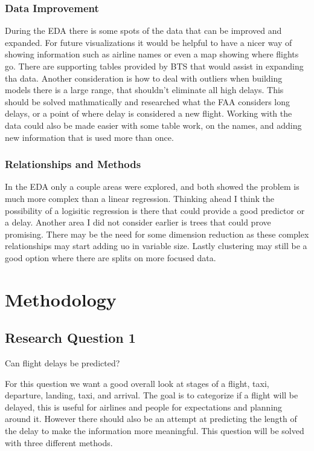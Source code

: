 \documentclass[a4paper,12pt]{article}
\begin{document}
\subsubsection{Data Improvement}
During the EDA there is some spots of the data that can be improved and expanded. For future visualizations it would be helpful to have a nicer way of showing information
such as airline names or even a map showing where flights go. There are supporting tables provided by BTS that would assist in expanding tha data. Another consideration is how to deal with outliers when building models
there is a large range, that shouldn't eliminate all high delays. This should be solved mathmatically and researched what the FAA considers long delays, or a point of where delay is considered a new flight. Working with the data 
could also be made easier with some table work, on the names, and adding new information that is used more than once.

\subsubsection{Relationships and Methods}
In the EDA only a couple areas were explored, and both showed the problem is much more complex than a linear regression. Thinking ahead I think the possibility of a logisitic regression is there that could provide a good predictor or a delay.
Another area I did not consider earlier is trees that could prove promising. There may be the need for some dimension reduction as these complex relationships may start adding uo in variable size. Lastly clustering may still be a good option where there are splits on more focused data.

\section{Methodology}

\subsection{Research Question 1}
Can flight delays be predicted?

For this question we want a good overall look at stages of a flight, taxi, departure, landing, taxi, and arrival. The goal is to categorize if a flight will be delayed,
this is useful for airlines and people for expectations and planning around it. However there should also be an attempt at predicting the length of the delay to make 
the information more meaningful. This question will be solved with three different methods.
\end{document}
